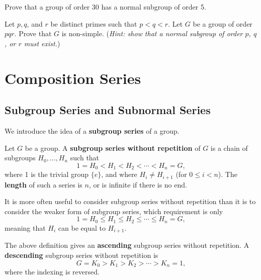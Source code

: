 \begin{problem}\label{problem-group-of-order-30-has-normal-subgroup-of-order-5}
    Prove that a group of order 30 has a normal subgroup of order 5.
\end{problem}

\begin{problem}\label{problem-group-of-order-pqr-is-non-simple}
    Let $p, q$, and $r$ be distinct primes such that $p < q < r$. Let $G$ be a group of order $pqr$. Prove that $G$ is non-simple.\newline
    (\textit{Hint: show that a normal subgroup of order $p$, $q$, or $r$ must exist.})
\end{problem}

\chapter{Composition Series}
\section{Subgroup Series and Subnormal Series}
We introduce the idea of a \textbf{subgroup series} of a group.
\begin{definition}
    Let $G$ be a group. A \textbf{subgroup series without repetition} of $G$ is a chain of subgroups $H_0, \dots, H_n$ such that
    \[
        1 = H_0 < H_1 < H_2 < \cdots < H_n = G,
    \]
    where 1 is the trivial group $\{e\}$, and where $H_i \neq H_{i+1}$ (for $0 \leq i < n$). The \textbf{length} of such a series is $n$, or is infinite if there is no end.
\end{definition}
\begin{remark}
    It is more often useful to consider subgroup series without repetition than it is to consider the weaker form of subgroup series, which requirement is only
    \[
        1 = H_0 \leq H_1 \leq H_2 \leq \cdots \leq H_n = G,
    \]
    meaning that $H_i$ can be equal to $H_{i+1}$.
\end{remark}
\begin{remark}
    The above definition gives an \textbf{ascending} subgroup series without repetition. A \textbf{descending} subgroup series without repetition is
    \[
        G = K_0 > K_1 > K_2 > \cdots > K_n = 1,
    \]
    where the indexing is reversed.
\end{remark}

